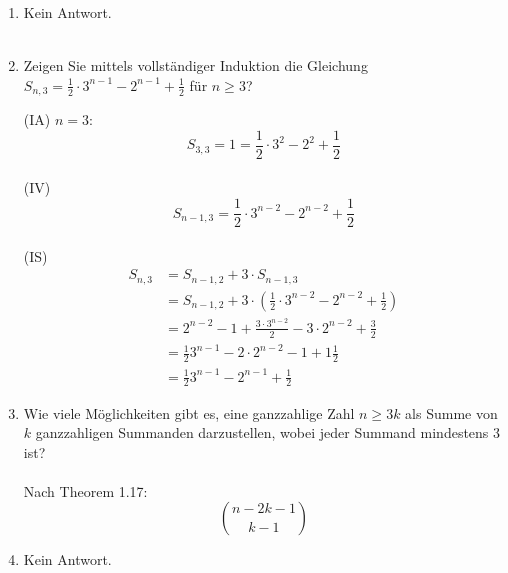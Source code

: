 \begin{enumerate}[label=(\alph*)]
        \item Kein Antwort.\\\\
        \item Zeigen Sie mittels vollständiger Induktion die Gleichung $S_{n,3} = \frac{1}{2} \cdot 3^{n-1} - 2^{n-1} + \frac{1}{2}$ für $n \ge 3$?\par
		(IA) $n=3:$ \[ S_{3,3} = 1 = \frac{1}{2} \cdot 3^{2} - 2^{2} + \frac{1}{2}\] \\
		(IV) \[S_{n-1,3} = \frac{1}{2} \cdot 3^{n-2} - 2^{n-2} + \frac{1}{2} \] \\
		(IS)             \begin{align*}
			S_{n,3} &= S_{n-1,2} + 3 \cdot S_{n-1,3} \tag{nach Theorem 1.15}\\
		            &= S_{n-1,2} + 3 \cdot (\frac{1}{2} \cdot 3^{n-2} - 2^{n-2} + \frac{1}{2} )  \tag{nach IV}\\
		            &= 2^{n-2} - 1 + \frac{3 \cdot 3^{n-2}}{2} -3 \cdot 2^{n-2} + \frac{3}{2} \tag{nach der Aufgabe f}\\
		            &= \frac{1}{2} 3^{n-1} - 2 \cdot 2^{n-2} -1 + 1\frac{1}{2} \\
		            &= \frac{1}{2} 3^{n-1} - 2^{n-1} + \frac{1}{2} 
		            		        	  \end{align*}
        \item Wie viele Möglichkeiten gibt es, eine ganzzahlige Zahl $n \ge 3k$ als Summe von $k$ ganzzahligen Summanden darzustellen, wobei jeder Summand mindestens $3$ ist?\\\\
        Nach Theorem 1.17: 
        \[ \binom{n-2k-1}{k-1} \]

        \item Kein Antwort.\\\\


\end{enumerate}
